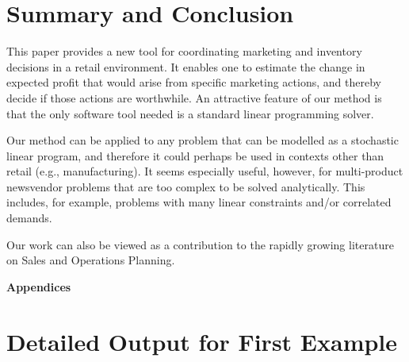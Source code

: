 \documentclass[a4paper,11pt]{article}
\begin{document}
\section{Summary and Conclusion}
\label{se:conclusion}

This paper provides a new tool for coordinating marketing and inventory decisions in a retail environment. It enables one to estimate the change in expected profit that would arise from specific marketing actions, and thereby decide if those actions are worthwhile. An attractive feature of our method is that the only software tool needed is a standard linear programming solver.

Our method can be applied to any problem that can be modelled as a stochastic linear program, and therefore it could perhaps be used in contexts other than retail (e.g., manufacturing). It seems especially useful, however, for multi-product newsvendor problems that are too complex to be solved analytically. This includes, for example, problems with many linear constraints and/or correlated demands.

Our work can also be viewed as a contribution to the rapidly growing literature on Sales and Operations Planning.

\printbibliography
\newpage
\begin{center}
{\bf\Large Appendices}
\end{center}

\appendix

\section{Detailed Output for First Example} \label{se:report}
\end{document}
